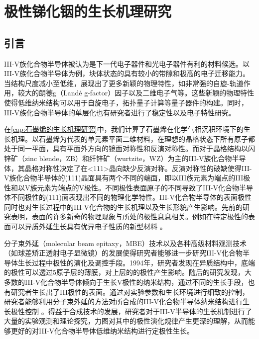 \chapter{极性锑化铟的生长机理研究}
\section{引言}
III-V族化合物半导体被认为是下一代电子器件和光电子器件有利的材料候选。以III-V族化合物半导体为例，块体状态的具有较小的带隙和极高的电子迁移能力。当结构尺度减小至低维，展现出了更多新颖的物理特性，如非常强的自旋-轨道作用，较大的朗德g（Landé g-factor）因子以及二维电子气等。这些新颖的物理特性使得低维纳米结构可以用于自旋电子，拓扑量子计算等量子器件的构建。同时，III-V族化合物半导体的单层化也有研究者进行了稳定性以及电子特性研究。

在\ref{cap:石墨烯的生长机理研究}中，我们计算了石墨烯在化学气相沉积环境下的生长机理。以石墨烯为代表的单元素平面二维材料，在理想的晶格状态下所有原子都处于同一平面，具有平面外方向的镜面对称性和反演对称性。而对于晶格结构以闪锌矿（zinc blende，ZB）和纤锌矿（wurtzite，WZ）为主的III-V族化合物半导体，其晶格对称性决定了在<111>晶向缺少反演对称。反演对称性的破缺使得III-V族化合物半导体的(111)晶面具有两个不同的端面，即以III族元素为端点的III极性和以V族元素为端点的V极性。不同极性表面原子的不同导致了III-V化合物半导体不同极性的(111)面表现出不同的物理化学特性。III-V化合物半导体的表面极性同时也对生长过程中的III-V化合物的生长机理以及生长形貌产生影响。先前的研究表明，表面的许多新奇的物理现象与所处的极性息息相关。例如在特定极性的表面可以异质外延生长具有优异电子性质的新型材料 。

分子束外延（molecular beam epitaxy，MBE）技术以及各种高级材料观测技术（如球差矫正透射电子显微镜）的发展使得研究者能够进一步研究III-V化合物半导体生长过程中极性的演化及调控手段。1994年，研究者发现在异质结构中，底端的极性可以透过5原子层的薄膜，对上层的的极性产生影响。随后的研究发现，大多数的III-V化合物半导体倾向于生长V极性的纳米结构，通过不同的生长手段，也有研究者生长出了III极性的表面。通过对实验参数和生长环境进行细致的控制，研究者能够利用分子束外延的方法对所合成的III-V化合物半导体纳米结构进行生长极性控制 。得益于合成技术的发展，研究者对于III-V半导体的生长机制进行了大量的实验观测和理论探究，力图对其中的极性演化规律产生更深的理解，从而能够更好的对III-V化合物半导体低维纳米结构进行定极性生长。

